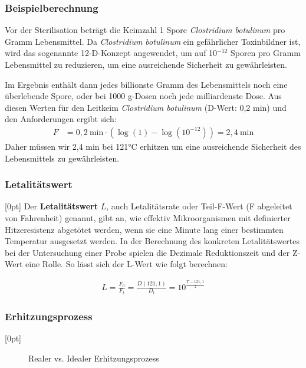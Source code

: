 \documentclass[a4paper,10pt,twoside]{article}
\begin{document}
\subsubsection{Beispielberechnung}
Vor der Sterilisation beträgt die Keimzahl 1 Spore \textit{Clostridium botulinum} pro Gramm Lebensmittel. Da \textit{Clostridium botulinum} ein gefährlicher Toxinbildner ist, wird das sogenannte 12-D-Konzept angewendet, um auf 10$^{-12}$ Sporen pro Gramm Lebensmittel zu reduzieren, um eine ausreichende Sicherheit zu gewährleisten.\par 
Im Ergebnis enthält dann jedes billionste Gramm des Lebensmittels noch eine überlebende Spore, oder bei 1000 g-Dosen noch jede milliardenste Dose. Aus diesen Werten für den Leitkeim \textit{Clostridium botulinum} (D-Wert: 0,2 min) und den Anforderungen ergibt sich:
\begin{align*}
F &= 0,2 ~\text{min} \cdot (\log (1) - \log (10^{-12})) = 2,4 ~\text{min}
\end{align*}
Daher müssen wir 2,4 min bei 121°C erhitzen um eine ausreichende Sicherheit des Lebensmittels zu gewährleisten.

\subsubsection{Letalitätswert}

\marginnote[Je kleiner der Letalitätswert, desto effektiver \pp L = 1 \RA 121°C bei 1min \par L = 0,1 \RA 121°C bei 0,1min]{}[0pt]
Der \textbf{Letalitätswert} $L$, auch Letalitätsrate oder Teil-F-Wert (F abgeleitet von Fahrenheit) genannt, gibt an, wie effektiv Mikroorganismen mit definierter Hitzeresistenz abgetötet werden, wenn sie eine Minute lang einer bestimmten Temperatur ausgesetzt werden. \pp
In der Berechnung des konkreten Letalitätswertes bei der Untersuchung einer Probe spielen die Dezimale Reduktionszeit und der Z-Wert eine Rolle. \pp
So lässt sich der L-Wert wie folgt berechnen:


\begin{align*}
L = \frac{F_0}{F_t} = \frac{D(121,1)}{D_t} = 10^{\frac{T-121,1}{z}}
\end{align*}


\subsubsection{Erhitzungsprozess}
[0pt]
\begin{figure}[h]
\centering
{}
\caption{Realer vs. Idealer Erhitzungsprozess}
\end{figure}
\end{document}
